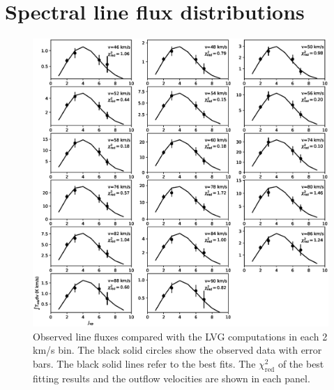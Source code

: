\documentclass[twocolumn]{aastex62}
\begin{document}
\section{Spectral line flux distributions}
\begin{figure}[htbp]
\addtocounter{figure}{1}
\includegraphics[scale=.60]{./fig/SED.eps}
\caption{Observed line fluxes compared with the LVG computations in each 2 km/s bin. The black solid circles show the observed data with error bars. The black solid lines refer to the best fits.  The $\chi^2_{\mathrm{red}}$ of the best fitting results and the outflow velocities are shown in each panel. \label{fig:figsed}}
\end{figure}
\end{document}
